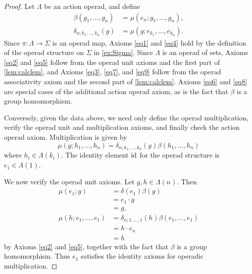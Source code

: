 \begin{proof}
Let $\Lambda$ be an action operad, and define 
\begin{align*}\label{eqn:bd-from-aop}
\beta(g_1, \ldots, g_n) & = \mu(e_n; g_1, \ldots, g_n),\\
\delta_{n; k_1, \ldots, k_n}(g) & = \mu(g; e_{k_1}, \ldots, e_{k_n}).
\end{align*}
Since $\pi \colon \Lambda \rightarrow \Sigma$ is an operad map, Axioms \ref{eq1} and \ref{eq4} hold by the definition of the operad structure on $\Sigma$ in \cref{ex:Sigma}. 
Since $\Lambda$ is an operad of sets, Axioms \ref{eq2} and \ref{eq5} follow from the operad unit axioms and the first part of \cref{lem:calclem}, and Axioms \ref{eq3}, \ref{eq7}, and \ref{eq9} follow from the operad associativity axiom and the second part of \cref{lem:calclem}. Axioms \ref{eq6} and \ref{eq8} are special cases of the additional action operad axiom, as is the fact that $\beta$ is a group homomorphism.

Conversely, given the data above, we need only define the operad multiplication, verify the operad unit and multiplication axioms, and finally check the action operad axiom. Multiplication is given by
  \[
    \mu(g; h_{1}, \ldots, h_{n}) = \delta_{n; k_{1}, \ldots, k_{n}}(g) \beta(h_{1}, \ldots, h_{n})
  \]
where $h_{i} \in \Lambda(k_{i})$. The identity element $\textrm{id}$ for the operad structure is $e_1 \in \Lambda(1)$.

We now verify the operad unit axioms. Let $g, h \in \Lambda(n)$. Then
  \begin{align*}
    \mu(e_1; g) &= \delta(e_1)\beta(g) \\
    &= e_1 \cdot g \\
    &= g, \\
    \mu(h; e_1, \ldots, e_1) &= \delta_{n; 1, \ldots, 1}(h)\beta(e_1, \ldots, e_1) \\
    &= h \cdot e_n \\
    &= h
  \end{align*}
by Axioms \ref{eq2} and \ref{eq5}, together with the fact that $\beta$ is a group homomorphism.
Thus $e_1$ satisfies the identity axioms for operadic multiplication.


\end{proof}
